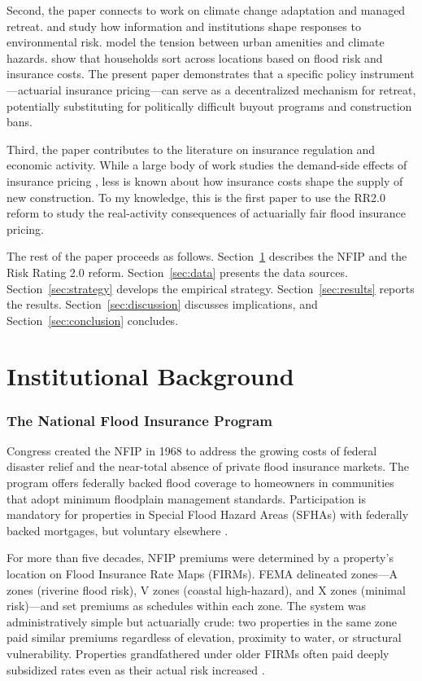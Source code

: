 \documentclass[12pt]{article}
\begin{document}
Second, the paper connects to work on climate change adaptation and managed retreat. \citet{hino2021} and \citet{kahn2005} study how information and institutions shape responses to environmental risk. \citet{bunten2017} model the tension between urban amenities and climate hazards. \citet{bakkensen2022} show that households sort across locations based on flood risk and insurance costs. The present paper demonstrates that a specific policy instrument---actuarial insurance pricing---can serve as a decentralized mechanism for retreat, potentially substituting for politically difficult buyout programs and construction bans.

Third, the paper contributes to the literature on insurance regulation and economic activity. While a large body of work studies the demand-side effects of insurance pricing \citep{gallagher2014, bradt2021, gibson2019}, less is known about how insurance costs shape the supply of new construction. To my knowledge, this is the first paper to use the RR2.0 reform to study the real-activity consequences of actuarially fair flood insurance pricing.

The rest of the paper proceeds as follows. Section~\ref{sec:background} describes the NFIP and the Risk Rating 2.0 reform. Section~\ref{sec:data} presents the data sources. Section~\ref{sec:strategy} develops the empirical strategy. Section~\ref{sec:results} reports the results. Section~\ref{sec:discussion} discusses implications, and Section~\ref{sec:conclusion} concludes.


\section{Institutional Background}
\label{sec:background}

\subsubsection*{The National Flood Insurance Program} Congress created the NFIP in 1968 to address the growing costs of federal disaster relief and the near-total absence of private flood insurance markets. The program offers federally backed flood coverage to homeowners in communities that adopt minimum floodplain management standards. Participation is mandatory for properties in Special Flood Hazard Areas (SFHAs) with federally backed mortgages, but voluntary elsewhere \citep{kousky2018}.

For more than five decades, NFIP premiums were determined by a property's location on Flood Insurance Rate Maps (FIRMs). FEMA delineated zones---A zones (riverine flood risk), V zones (coastal high-hazard), and X zones (minimal risk)---and set premiums as schedules within each zone. The system was administratively simple but actuarially crude: two properties in the same zone paid similar premiums regardless of elevation, proximity to water, or structural vulnerability. Properties grandfathered under older FIRMs often paid deeply subsidized rates even as their actual risk increased \citep{mulder2021}.
\end{document}
